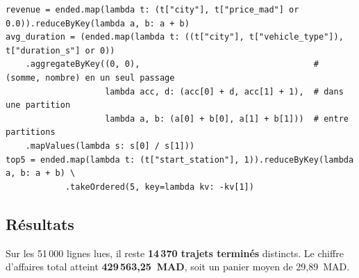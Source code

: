 \documentclass[10pt,a4paper]{article}
\begin{document}
\begin{lstlisting}[style=py]
revenue = ended.map(lambda t: (t["city"], t["price_mad"] or 0.0)).reduceByKey(lambda a, b: a + b)
avg_duration = (ended.map(lambda t: ((t["city"], t["vehicle_type"]), t["duration_s"] or 0))
    .aggregateByKey((0, 0),                                   # (somme, nombre) en un seul passage
                    lambda acc, d: (acc[0] + d, acc[1] + 1),  # dans une partition
                    lambda a, b: (a[0] + b[0], a[1] + b[1]))  # entre partitions
    .mapValues(lambda s: s[0] / s[1]))
top5 = ended.map(lambda t: (t["start_station"], 1)).reduceByKey(lambda a, b: a + b) \
            .takeOrdered(5, key=lambda kv: -kv[1])
\end{lstlisting}

\subsection{Résultats}

Sur les 51\,000 lignes lues, il reste \textbf{14\,370 trajets terminés} distincts. Le
chiffre d'affaires total atteint \textbf{429\,563,25~MAD}, soit un panier moyen de
29,89~MAD.
\end{document}

